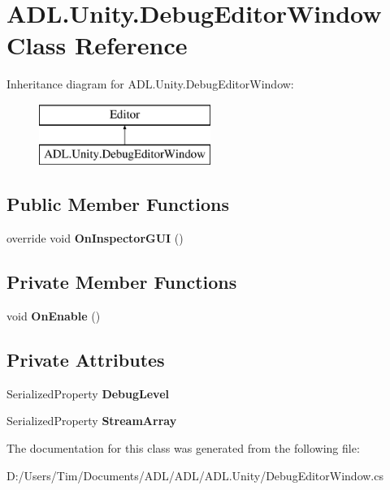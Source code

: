 \hypertarget{class_a_d_l_1_1_unity_1_1_debug_editor_window}{}\section{A\+D\+L.\+Unity.\+Debug\+Editor\+Window Class Reference}
\label{class_a_d_l_1_1_unity_1_1_debug_editor_window}
Inheritance diagram for A\+D\+L.\+Unity.\+Debug\+Editor\+Window\+:\begin{figure}[H]
\begin{center}
\leavevmode
\includegraphics[height=2.000000cm]{class_a_d_l_1_1_unity_1_1_debug_editor_window}
\end{center}
\end{figure}
\subsection*{Public Member Functions}
\begin{DoxyCompactItemize}
\item 
\mbox{\label{class_a_d_l_1_1_unity_1_1_debug_editor_window_ab25bbc6b5b7b8260e76dbf9a781fa815}} 
override void {\bfseries On\+Inspector\+G\+UI} ()
\end{DoxyCompactItemize}
\subsection*{Private Member Functions}
\begin{DoxyCompactItemize}
\item 
\mbox{\label{class_a_d_l_1_1_unity_1_1_debug_editor_window_a9f041720e003ee2f99df45e6abdf82d5}} 
void {\bfseries On\+Enable} ()
\end{DoxyCompactItemize}
\subsection*{Private Attributes}
\begin{DoxyCompactItemize}
\item 
\mbox{\label{class_a_d_l_1_1_unity_1_1_debug_editor_window_a2eee4bf996ebefb9635562de4614d81b}} 
Serialized\+Property {\bfseries Debug\+Level}
\item 
\mbox{\label{class_a_d_l_1_1_unity_1_1_debug_editor_window_a26a9228db06af7ae00ae440ac2a0426e}} 
Serialized\+Property {\bfseries Stream\+Array}
\end{DoxyCompactItemize}


The documentation for this class was generated from the following file\+:\begin{DoxyCompactItemize}
\item 
D\+:/\+Users/\+Tim/\+Documents/\+A\+D\+L/\+A\+D\+L/\+A\+D\+L.\+Unity/Debug\+Editor\+Window.\+cs\end{DoxyCompactItemize}
